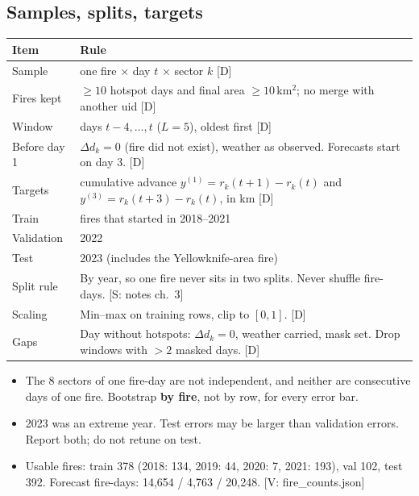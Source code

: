 \documentclass[11pt,a4paper]{article}
\newcommand{\tagbox}[2]{{\footnotesize\color{#1}\textsf{[#2]}}}
\newcommand{\supp}[1]{\tagbox{ForestGreen!70!black}{S: #1}}  %
\newcommand{\veri}[1]{\tagbox{ForestGreen!70!black}{V: #1}}  %
\newcommand{\ours}{\tagbox{NavyBlue}{D}}                      %
\begin{document}
\subsection{Samples, splits, targets}
\begin{center}\small
\begin{tabularx}{\linewidth}{@{}l Y@{}}
\toprule
\textbf{Item} & \textbf{Rule}\\
\midrule
Sample & one fire $\times$ day $t$ $\times$ sector $k$ \ours\\
Fires kept & $\ge10$ hotspot days and final area $\ge10$\,km$^2$; no merge with another uid \ours\\
Window & days $t-4,\dots,t$ ($L=5$), oldest first \ours\\
Before day 1 & $\Delta d_k=0$ (fire did not exist), weather as observed. Forecasts start on day 3. \ours\\
Targets & cumulative advance $y^{(1)}=r_k(t+1)-r_k(t)$ and $y^{(3)}=r_k(t+3)-r_k(t)$, in km \ours\\
Train & fires that started in 2018--2021\\
Validation & 2022\\
Test & 2023 (includes the Yellowknife-area fire)\\
Split rule & By year, so one fire never sits in two splits. Never shuffle fire-days. \supp{notes ch.~3}\\
Scaling & Min--max on training rows, clip to $[0,1]$. \ours\\
Gaps & Day without hotspots: $\Delta d_k=0$, weather carried, mask set. Drop windows with $>2$ masked days. \ours\\
\bottomrule
\end{tabularx}
\end{center}

\begin{watch}
\begin{itemize}
\item The 8 sectors of one fire-day are not independent, and neither are consecutive days of one fire.
  Bootstrap \textbf{by fire}, not by row, for every error bar.
\item 2023 was an extreme year. Test errors may be larger than validation errors. Report both; do not retune on test.
\item Usable fires: train 378 (2018: 134, 2019: 44, 2020: 7, 2021: 193), val 102, test 392. Forecast fire-days:
  14{,}654 / 4{,}763 / 20{,}248. \veri{fire\_counts.json}
\end{itemize}
\end{watch}
\end{document}
